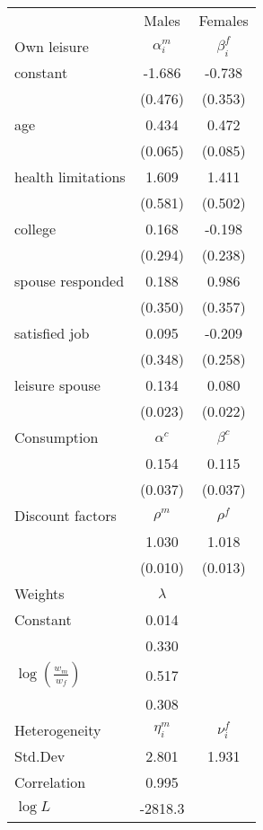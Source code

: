 \begin{tabular}{lcc} 
\hline\hline 
 & Males & Females \\ 
Own leisure & $\alpha_{i}^{m}$ & $\beta_{i}^{f}$ \\ 
constant & -1.686 & -0.738 \\ 
 & (0.476) & (0.353) \\ 
age & 0.434 & 0.472 \\ 
 & (0.065) & (0.085) \\ 
health limitations & 1.609 & 1.411 \\ 
 & (0.581) & (0.502) \\ 
college & 0.168 & -0.198 \\ 
 & (0.294) & (0.238) \\ 
spouse responded & 0.188 & 0.986 \\ 
 & (0.350) & (0.357) \\ 
satisfied job & 0.095 & -0.209 \\ 
 & (0.348) & (0.258) \\ 
leisure spouse & 0.134 & 0.080 \\ 
 & (0.023) & (0.022) \\ 
Consumption & $\alpha^{c}$ & $\beta^{c}$ \\ 
 & 0.154 & 0.115 \\ 
 & (0.037) & (0.037) \\ 
Discount factors & $\rho^m$ & $\rho^f$ \\ 
 & 1.030 & 1.018 \\ 
 & (0.010) & (0.013) \\ 
Weights & $\lambda$ &  \\ 
Constant & 0.014 &  \\ 
 & 0.330 &  \\ 
$\log(\frac{w_m}{w_f})$ & 0.517 &  \\ 
 & 0.308 &  \\ 
Heterogeneity & $\eta_i^m$ & $\nu_i^f$ \\ 
Std.Dev & 2.801 & 1.931 \\ 
Correlation & 0.995 &  \\ 
\hline 
$\log L$ & -2818.3 & \\ 
\hline \hline 
\end{tabular} 
